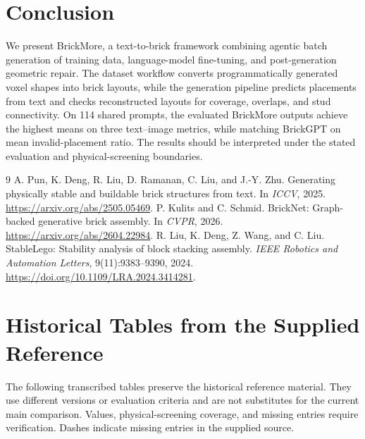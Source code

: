 \documentclass[10pt,twocolumn,letterpaper]{article}
\begin{document}
\section{Conclusion}
We present BrickMore, a text-to-brick framework combining agentic batch generation of training data, language-model fine-tuning, and post-generation geometric repair. The dataset workflow converts programmatically generated voxel shapes into brick layouts, while the generation pipeline predicts placements from text and checks reconstructed layouts for coverage, overlaps, and stud connectivity. On 114 shared prompts, the evaluated BrickMore outputs achieve the highest means on three text--image metrics, while matching BrickGPT on mean invalid-placement ratio. The results should be interpreted under the stated evaluation and physical-screening boundaries.

\FloatBarrier
{\footnotesize
\begin{thebibliography}{9}
 A. Pun, K. Deng, R. Liu, D. Ramanan, C. Liu, and J.-Y. Zhu. Generating physically stable and buildable brick structures from text. In \emph{ICCV}, 2025. \url{https://arxiv.org/abs/2505.05469}.
 P. Kulits and C. Schmid. BrickNet: Graph-backed generative brick assembly. In \emph{CVPR}, 2026. \url{https://arxiv.org/abs/2604.22984}.
 R. Liu, K. Deng, Z. Wang, and C. Liu. StableLego: Stability analysis of block stacking assembly. \emph{IEEE Robotics and Automation Letters}, 9(11):9383--9390, 2024. \url{https://doi.org/10.1109/LRA.2024.3414281}.
\end{thebibliography}}
\clearpage
\onecolumn
\appendix
\section{Historical Tables from the Supplied Reference}
The following transcribed tables preserve the historical reference material. They use different versions or evaluation criteria and are not substitutes for the current main comparison. Values, physical-screening coverage, and missing entries require verification. Dashes indicate missing entries in the supplied source.

\end{document}
